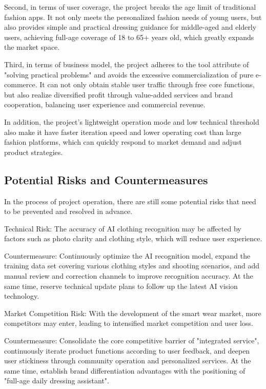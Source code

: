 \documentclass[12pt,a4paper]{article}
\begin{document}
Second, in terms of user coverage, the project breaks the age limit of traditional fashion apps. It not only meets the personalized fashion needs of young users, but also provides simple and practical dressing guidance for middle-aged and elderly users, achieving full-age coverage of 18 to 65+ years old, which greatly expands the market space.

Third, in terms of business model, the project adheres to the tool attribute of "solving practical problems" and avoids the excessive commercialization of pure e-commerce. It can not only obtain stable user traffic through free core functions, but also realize diversified profit through value-added services and brand cooperation, balancing user experience and commercial revenue.

In addition, the project's lightweight operation mode and low technical threshold also make it have faster iteration speed and lower operating cost than large fashion platforms, which can quickly respond to market demand and adjust product strategies.

\subsection{Potential Risks and Countermeasures}
In the process of project operation, there are still some potential risks that need to be prevented and resolved in advance.

Technical Risk: The accuracy of AI clothing recognition may be affected by factors such as photo clarity and clothing style, which will reduce user experience.

Countermeasure: Continuously optimize the AI recognition model, expand the training data set covering various clothing styles and shooting scenarios, and add manual review and correction channels to improve recognition accuracy. At the same time, reserve technical update plans to follow up the latest AI vision technology.

Market Competition Risk: With the development of the smart wear market, more competitors may enter, leading to intensified market competition and user loss.

Countermeasure: Consolidate the core competitive barrier of "integrated service", continuously iterate product functions according to user feedback, and deepen user stickiness through community operation and personalized services. At the same time, establish brand differentiation advantages with the positioning of "full-age daily dressing assistant".
\end{document}
